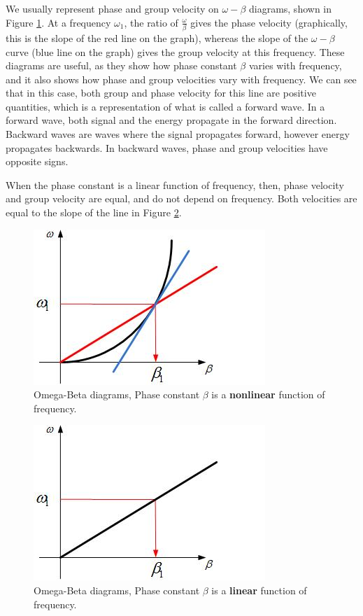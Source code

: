 \documentclass{ximera}
\begin{document}
\begin{itemize}
We usually represent phase and group velocity on $\omega-\beta$ diagrams, shown in Figure \ref{omegabeta1}. At a frequency $\omega_1$, the ratio of $\frac{\omega}{\beta}$ gives the phase velocity (graphically, this is the slope of the red line on the graph), whereas the slope of the $\omega-\beta$ curve (blue line on the graph) gives the group velocity at this frequency. These diagrams are useful, as they show how phase constant $\beta$ varies with frequency, and it also shows how phase and group velocities vary with frequency. We can see that in this case, both group and phase velocity for this line are positive quantities, which is a representation of what is called a forward wave. In a forward wave, both signal and the energy propagate in the forward direction. Backward waves are waves where the signal propagates forward, however energy propagates backwards. In backward waves, phase and group velocities have opposite signs.  

When the phase constant is a linear function of frequency, then, phase velocity and group velocity are equal, and do not depend on frequency. Both velocities are equal to the slope of the line in Figure \ref{omegabeta2}.

\begin{figure}[htbp]
\begin{center}
\includegraphics[scale=0.6]{../jpg/omegabeta1.jpg}
\caption{Omega-Beta diagrams, Phase constant $\beta$ is a {\bf nonlinear} function of frequency.}\label{omegabeta1}
\end{center}
\end{figure}


\begin{figure}[htbp]
\begin{center}
\includegraphics[scale=0.6]{../jpg/omegabeta2.jpg}
\caption{Omega-Beta diagrams, Phase constant $\beta$ is a {\bf linear} function of frequency.}\label{omegabeta2}
\end{center}
\end{figure}


\end{itemize}
\end{document}
